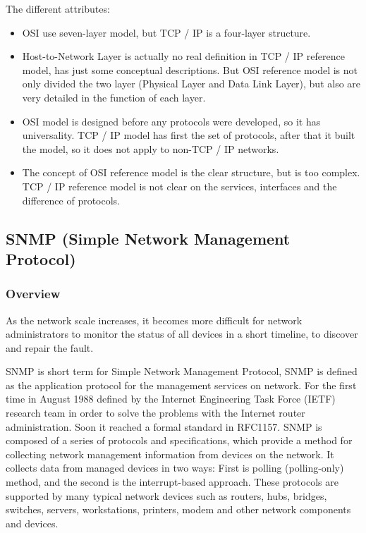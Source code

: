 The different attributes: 
\begin{itemize}
	\item OSI use seven-layer model, but TCP / IP is a four-layer structure.  
	\item Host-to-Network Layer is actually no real definition in TCP / IP reference model, has just some conceptual descriptions. But OSI reference model is not only divided the two layer (Physical Layer and Data Link Layer), but also are very detailed in the function of each layer.  
	\item OSI model is designed before any protocols were developed, so it has universality. TCP / IP model has first the set of protocols, after that it built the model, so it does not apply to non-TCP / IP networks.  
	\item The concept of OSI reference model is the clear structure, but is too complex. TCP / IP reference model is not clear on the services, interfaces and the difference of protocols. 
\end{itemize}

\subsection{SNMP (Simple Network Management Protocol)}

\subsubsection{Overview}

As the network scale increases, it becomes more difficult for network administrators to monitor the status of all devices in a short timeline, to discover and repair the fault.  

SNMP is short term for Simple Network Management Protocol, SNMP is defined as the application protocol for the management services on network. For the first time in August 1988 defined by the Internet Engineering Task Force (IETF) research team in order to solve the problems with the Internet router administration. Soon it reached a formal standard in RFC1157. SNMP is composed of a series of protocols and specifications, which provide a method for collecting network management information from devices on the network. It collects data from managed devices in two ways: First is polling (polling-only) method, and the second is the interrupt-based approach. These protocols are supported by many typical network devices such as routers, hubs, bridges, switches, servers, workstations, printers, modem and other network components and devices.  

